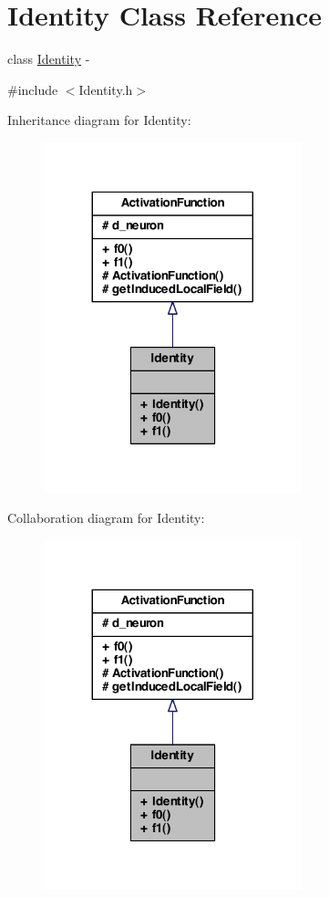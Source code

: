 \hypertarget{class_identity}{
\section{Identity Class Reference}
\label{class_identity}
}


class \hyperlink{class_identity}{Identity} -\/  




{\ttfamily \#include $<$Identity.h$>$}



Inheritance diagram for Identity:\nopagebreak
\begin{figure}[H]
\begin{center}
\leavevmode
\includegraphics[width=212pt]{class_identity__inherit__graph}
\end{center}
\end{figure}


Collaboration diagram for Identity:\nopagebreak
\begin{figure}[H]
\begin{center}
\leavevmode
\includegraphics[width=212pt]{class_identity__coll__graph}
\end{center}
\end{figure}
